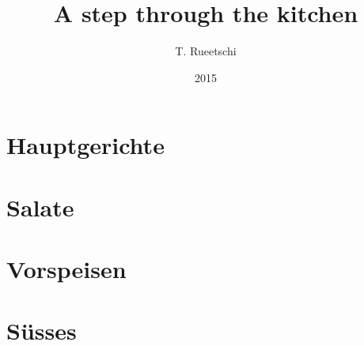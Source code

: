 \documentclass[
  a5paper,
  ngerman,
]{spcookbook}
\title{A step through the kitchen}
\author{T. Rueetschi}
\date{2015}
\begin{document}
\Titlepage
\tableofcontents

\section{Hauptgerichte}








\section{Salate}


\section{Vorspeisen}



\section{S\"usses}


\newpage


\end{document}
